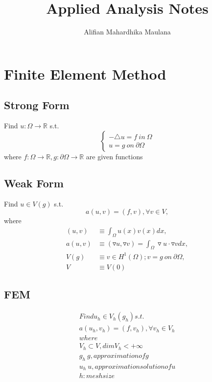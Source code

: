 \documentclass[a4paper,12pt]{article}
\title{Applied Analysis Notes}
\author{Alifian Mahardhika Maulana}
\newcommand{\R}{\mathbb{R}}
\begin{document}
\maketitle
\section{Finite Element Method}
\subsection{Strong Form}
Find $u:\Omega\rightarrow\R$ s.t.
\begin{equation}
\begin{cases}
-\triangle u = f\ in\ \Omega\\
u = g\ on\ \partial\Omega
\end{cases}
\end{equation}
where $f:\Omega \rightarrow \R,g:\partial\Omega \rightarrow \R$ are given functions
\subsection{Weak Form}
Find $u\in V(g)$ s.t.
\begin{equation}\nonumber
a(u,v) = (f,v), \forall v \in V,
\end{equation}
where
\begin{equation}\nonumber
\begin{aligned}
(u,v) &\equiv \int_\Omega u(x)v(x)dx,\\
a(u,v) &\equiv (\triangledown u, \triangledown v) = \int_\Omega \triangledown u \cdot \triangledown v dx,\\
V(g) &\equiv {v \in H^1(\Omega); v = g\ on\ \partial\Omega},\\
V &\equiv V(0)
\end{aligned}
\end{equation}
\subsection{FEM}
\begin{equation}\nonumber
\begin{aligned}
Find u_h \in V_h(g_h) s.t.\\
a(u_h,v_h) = (f,v_h), \forall v_h \in V_h\\
where\\
V_h \subset V, dim V_h < +\infty\\
g_h ~ g, approximation of g\\
u_h ~u, approximation solution of u\\
h : mesh size
\end{aligned}
\end{equation}
\end{document}
